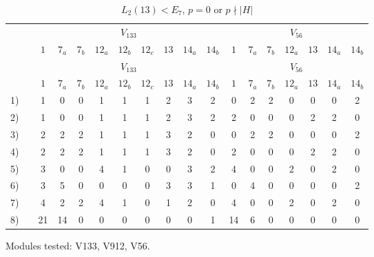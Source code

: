 \setcounter{table}{173}
\begin{longtable}{rc|ccccccccc|ccccccc}
\caption{$L_2(13) < E_7$, $p = 0$ or $p \nmid |H|$}\\
& & \multicolumn{9}{c|}{$V_{133}$} & \multicolumn{7}{c}{$V_{56}$} \\
& & $1$ & $7_{a}$ & $7_{b}$ & $12_{a}$ & $12_{b}$ & $12_{c}$ & $13$ & $14_{a}$ & $14_{b}$ & $1$ & $7_{a}$ & $7_{b}$ & $12_{a}$ & $13$ & $14_{a}$ & $14_{b}$ \\ \hline
\endfirsthead
& & \multicolumn{9}{c|}{$V_{133}$} & \multicolumn{7}{c}{$V_{56}$} \\
& & $1$ & $7_{a}$ & $7_{b}$ & $12_{a}$ & $12_{b}$ & $12_{c}$ & $13$ & $14_{a}$ & $14_{b}$ & $1$ & $7_{a}$ & $7_{b}$ & $12_{a}$ & $13$ & $14_{a}$ & $14_{b}$ \\ \hline
\endhead
1) &  & 1 & 0 & 0 & 1 & 1 & 1 & 2 & 3 & 2 & 0 & 2 & 2 & 0 & 0 & 0 & 2 \\
2) &  & 1 & 0 & 0 & 1 & 1 & 1 & 2 & 3 & 2 & 2 & 0 & 0 & 0 & 2 & 2 & 0 \\
3) &  & 2 & 2 & 2 & 1 & 1 & 1 & 3 & 2 & 0 & 0 & 2 & 2 & 0 & 0 & 0 & 2 \\
4) &  & 2 & 2 & 2 & 1 & 1 & 1 & 3 & 2 & 0 & 2 & 0 & 0 & 0 & 2 & 2 & 0 \\
5) &  & 3 & 0 & 0 & 4 & 1 & 0 & 0 & 3 & 2 & 4 & 0 & 0 & 2 & 0 & 2 & 0 \\
6) &  & 3 & 5 & 0 & 0 & 0 & 0 & 3 & 3 & 1 & 0 & 4 & 0 & 0 & 0 & 0 & 2 \\
7) &  & 4 & 2 & 2 & 4 & 1 & 0 & 1 & 2 & 0 & 4 & 0 & 0 & 2 & 0 & 2 & 0 \\
8) &  & 21 & 14 & 0 & 0 & 0 & 0 & 0 & 0 & 1 & 14 & 6 & 0 & 0 & 0 & 0 & 0 \\
\end{longtable}
\noindent Modules tested: V133, V912, V56.\\

